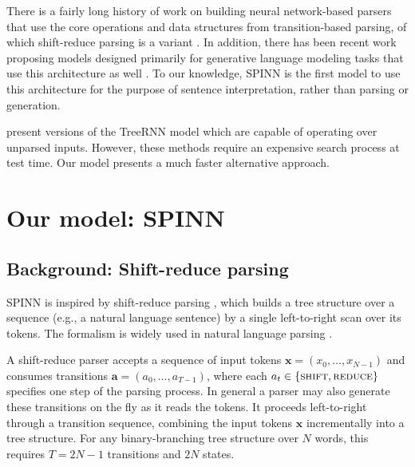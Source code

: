 \documentclass[11pt]{article}
\newcommand{\shift}{\textsc{shift}}
\newcommand{\reduce}{\textsc{reduce}}
\begin{document}
There is a fairly long history of work on building neural network-based parsers that use the core operations and data structures from transition-based parsing, of which shift-reduce parsing is a variant \citep{henderson2004discriminative,emami2005neural,titov2010latent,chen2014,buys2generative,dyer-EtAl:2015:ACL-IJCNLP,kiperwasser2016easy}. In addition, there has been recent work proposing models designed primarily for generative language modeling tasks that use this architecture as well \citep{zhang2016top,dyer2016rnn}. To our knowledge, SPINN is the first model to use this architecture for the purpose of sentence interpretation, rather than parsing or generation.  %

\citet{socher2011parsing,socher2011semi} present versions of the TreeRNN model which are capable of operating over unparsed inputs. However, these methods require an expensive search process at test time. Our model presents a much faster alternative approach.

\section{Our model: SPINN}

\subsection{Background: Shift-reduce parsing}

SPINN is inspired by shift-reduce parsing \citep{aho1972theory}, which builds a tree structure over a sequence (e.g., a natural language sentence) by a single left-to-right scan over its tokens. The formalism is widely used in natural language parsing \citep[e.g.,][]{shieber:1983:ACL,nivre2003efficient}.

A shift-reduce parser accepts a sequence of input tokens $\mathbf x = (x_0, \dots, x_{N-1})$ and consumes transitions $\mathbf a = (a_0, \dots, a_{T-1})$, where each $a_t \in \{\shift, \reduce\}$ specifies one step of the parsing process. In general a parser may also generate these transitions on the fly as it reads the tokens. It proceeds left-to-right through a transition sequence, combining the input tokens $\mathbf x$ incrementally into a tree structure. For any binary-branching tree structure over $N$ words, this requires $T=2N-1$ transitions and $2N$ states.
\end{document}
